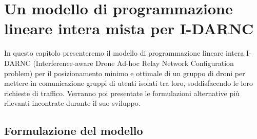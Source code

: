  \chapter{Un modello di programmazione lineare intera mista per I-DARNC} \label{chap:modello}
 In questo capitolo presenteremo il modello di programmazione lineare intera I-DARNC (Interference-aware Drone Ad-hoc Relay Network Configuration problem) per il posizionamento minimo e ottimale di un gruppo di droni per mettere in comunicazione gruppi di utenti isolati tra loro, soddisfacendo le loro richieste di traffico. Verranno poi presentate le formulazioni alternative più rilevanti incontrate durante il suo sviluppo.\\

\ifpdf
    \graphicspath{{Chapter5/Figs/Raster/}{Chapter5/Figs/PDF/}{Chapter5/Figs/}}
\else
    \graphicspath{{Chapter5/Figs/Vector/}{Chapter5/Figs/}}
\fi

\section{Formulazione del modello}

